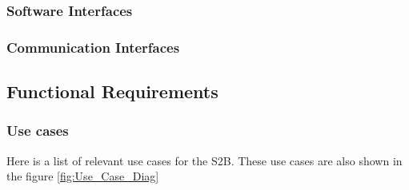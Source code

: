 \vfill


\subsubsection{Software Interfaces}
\subsubsection{Communication Interfaces}
\subsection{Functional Requirements}
\subsubsection{Use cases}
Here is a list of relevant use cases for the S2B. These use cases are also shown in the figure \ref{fig:Use_Case_Diag} 
\smallskip

